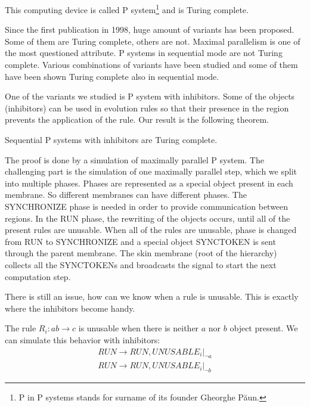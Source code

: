 \documentclass{svk_short_en}
\begin{document}
This computing device is called P system\footnote{P in P systems stands for surname of its founder Gheorghe P\u aun.} and is Turing complete.

Since the first publication in 1998, huge amount of variants has been proposed. Some of them are Turing complete, others are not. Maximal parallelism is one of the most questioned attribute. P systems in sequential mode are not Turing complete. Various combinations of variants have been studied and some of them have been shown Turing complete also in sequential mode.

One of the variants we studied is P system with inhibitors. Some of the objects (inhibitors) can be used in evolution rules so that their presence in the region prevents the application of the rule. Our result is the following theorem.

\begin{theorem}
\label{th:prop}
Sequential P systems with inhibitors are Turing complete.
\end{theorem}

The proof is done by a simulation of maximally parallel P system. The challenging part is the simulation of one maximally parallel step, which we split into  multiple phases. Phases are represented as a special object present in each membrane. So different membranes can have different phases.
The SYNCHRONIZE phase is needed in order to provide communication between regions.
In the RUN phase, the rewriting of the objects occurs, until all of the present rules are unusable. When all of the rules are unusable, phase is changed from RUN to SYNCHRONIZE and a special object SYNCTOKEN is sent through the parent membrane. The skin membrane (root of the hierarchy) collects all the SYNCTOKENs and broadcasts the signal to start the next computation step.

There is still an issue, how can we know when a rule is unusable. This is exactly where the inhibitors become handy.

The rule $R_i: ab \rightarrow c$ is unusable when there is neither $a$ nor $b$ object present. We can simulate this behavior with inhibitors:
\begin{align*}
  RUN \rightarrow RUN, UNUSABLE_i |_{\neg a}
  \\
  RUN \rightarrow RUN, UNUSABLE_i |_{\neg b}
\end{align*}




\end{document}
